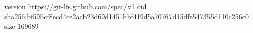 version https://git-lfs.github.com/spec/v1
oid sha256:bf595cf8ecd4ce2acb23d69d1451bbf419d5a70767d15dfe547355d110c256c0
size 169689
